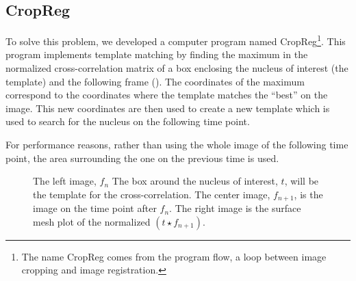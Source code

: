   \subsection{CropReg}
  
    To solve this problem, we developed a computer program named CropReg\footnote{The name CropReg
    comes from the program flow, a loop between image cropping and image registration.}. This
    program implements template matching  by
    finding the maximum in the normalized cross-correlation matrix of a
    box enclosing the nucleus of interest (the template) and the following frame (). The
    coordinates of the maximum correspond to the coordinates where the template matches the ``best'' on the
    image. This new coordinates are then used to create a new template which is used to search for the nucleus
    on the following time point.
    
    For performance reasons, rather than using the whole image of the following time point, the area surrounding
    the one on the previous time is used.
    
    \begin{figure}
      \centering
                   {The left image, $f_n$
                    The box around the nucleus of interest, $t$, will be the template for the cross-correlation.
                    The center image, $f_{n+1}$, is the image on the time point after $f_n$. The right image is
                    the surface mesh plot of the normalized $(t \star f_{n+1})$.}
      \label{fig:normxcorr2}
    \end{figure}
    
    
    
